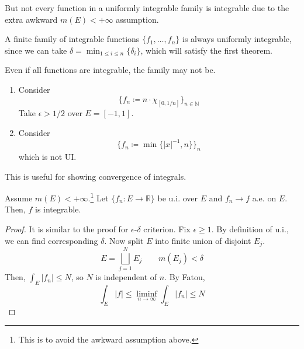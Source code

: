   But not every function in a uniformly integrable family is integrable due to the extra awkward $m(E) < +\infty$ assumption.  

  \begin{example}
    A finite family of integrable functions $\{f_1, \ldots, f_n\}$ is always uniformly integrable, since we can take $\delta = \min_{1 \leq i \leq n} \{\delta_i\}$, which will satisfy the first theorem. 
  \end{example}

  \begin{example}
    Even if all functions are integrable, the family may not be. 
    \begin{enumerate}
      \item Consider 
      \begin{equation}
        \{f_n \coloneqq n \cdot \chi_{[0, 1/n]}\}_{n \in \mathbb{N}} 
      \end{equation}
      Take $\epsilon > 1/2$ over $E = [-1, 1]$. 

      \item Consider 
      \begin{equation}
        \{f_n \coloneqq \min\{|x|^{-1}, n\} \}_n
      \end{equation}
      which is not UI. 
    \end{enumerate}
  \end{example}

  This is useful for showing convergence of integrals. 

  \begin{lemma} 
    Assume $m(E) < +\infty$.\footnote{This is to avoid the awkward assumption above.} Let $\{f_n: E \to \mathbb{R}\}$ be u.i. over $E$ and $f_n \to f$ a.e. on $E$. Then, $f$ is integrable. 
  \end{lemma}
  \begin{proof}
    It is similar to the proof for $\epsilon$-$\delta$ criterion. Fix $\epsilon \geq 1$. By definition of u.i., we can find corresponding $\delta$. Now split $E$ into finite union of disjoint $E_j$. 
    \begin{equation}
      E = \bigsqcup_{j=1}^N E_j \qquad m(E_j) < \delta
    \end{equation}
    Then, $\int_E |f_n| \leq N$, so $N$ is independent of $n$. By Fatou, 
    \begin{equation}
      \int_E |f| \leq \liminf_{n \to \infty} \int_E |f_n| \leq N
    \end{equation}
  \end{proof}

